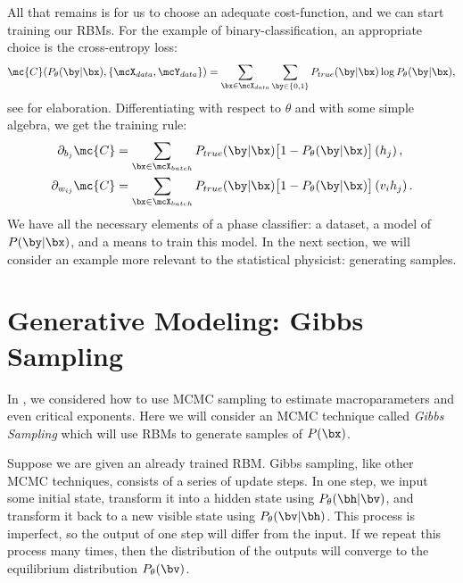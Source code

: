All that remains is for us to choose an adequate cost-function, and we
can start training our RBMs. For the example of binary-classification,
an appropriate choice is the cross-entropy loss:%
\begin{equation}%
  \mc{C}(P_\theta(\by\rvert\bx), \{\mcX_{data}, \mcY_{data}\})=\sum_{\bx\in\mcX_{data}} \sum_{\by\in\{0,1\}} P_{true}(\by\rvert\bx)\log P_\theta(\by\rvert\bx),
  \label{eq:cross-entropy}
\end{equation}%
see  for elaboration. Differentiating with
respect to $\theta$ and with some simple algebra, we get the training
rule:%
\begin{align}%
  \partial_{b_j} \mc{C}&=\sum_{\bx\in\mcX_{batch}} P_{true}(\by\rvert\bx) \big[1-P_\theta(\by\rvert\bx)\big]\left(h_j\right),\\
  \partial_{w_{ij}}\mc{C}&=\sum_{\bx\in\mcX_{batch}} P_{true}(\by\rvert\bx)\big[1-P_\theta(\by\rvert\bx)\big]\left(v_i h_j\right).
\end{align}%
We have all the necessary elements of a phase classifier: a dataset, a
model of $P(\by\rvert\bx)$, and a means to train this model. In the
next section, we will consider an example more relevant to the
statistical physicist: generating samples.

\section{Generative Modeling: Gibbs
  Sampling}\label{sec:rbm-generative-modeling}
In , we considered how to use MCMC sampling to
estimate macroparameters and even critical exponents.  Here we will
consider an MCMC technique called \textit{Gibbs Sampling} which will
use RBMs to generate samples of $P(\bx)$.

Suppose we are given an already trained RBM\@. Gibbs sampling, like other
MCMC techniques, consists of a series of update steps. In one step, we
input some initial state, transform it into a hidden state using
$P_\theta(\bh\rvert\bv)$, and transform it back to a new visible state
using $P_\theta(\bv\rvert\bh)$. This process is imperfect, so the
output of one step will differ from the input. If we repeat this
process many times, then the distribution of the outputs will converge
to the equilibrium distribution $P_\theta(\bv)$.

